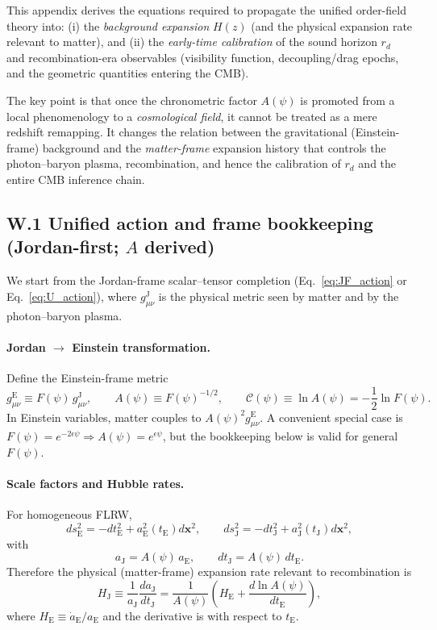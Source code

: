 \documentclass[10pt]{article}
\newcommand{\gJ}{g^{\mathrm{J}}}        %
\newcommand{\gE}{g^{\mathrm{E}}}        %
\newcommand{\aJ}{a_{\mathrm{J}}}
\newcommand{\aE}{a_{\mathrm{E}}}
\newcommand{\HJ}{H_{\mathrm{J}}}
\newcommand{\HE}{H_{\mathrm{E}}}
\newcommand{\tJ}{t_{\mathrm{J}}}
\newcommand{\tE}{t_{\mathrm{E}}}
\newcommand{\Fpsi}{F(\psi)}
\newcommand{\Apsi}{A(\psi)}
\newcommand{\Cpsi}{\mathcal{C}(\psi)} %
\begin{document}
This appendix derives the equations required to propagate the unified order-field theory into:
(i) the \emph{background expansion} $H(z)$ (and the physical expansion rate relevant to matter),
and (ii) the \emph{early-time calibration} of the sound horizon $r_d$ and recombination-era
observables (visibility function, decoupling/drag epochs, and the geometric quantities entering the CMB).

The key point is that once the chronometric factor $A(\psi)$ is promoted from a local phenomenology
to a \emph{cosmological field}, it cannot be treated as a mere redshift remapping. It changes the
relation between the gravitational (Einstein-frame) background and the \emph{matter-frame} expansion
history that controls the photon--baryon plasma, recombination, and hence the calibration of $r_d$
and the entire CMB inference chain.

\subsection{W.1 Unified action and frame bookkeeping (Jordan-first; \(A\) derived)}
\label{app:early_universe:frames}

We start from the Jordan-frame scalar--tensor completion
(Eq.~\eqref{eq:JF_action} or Eq.~\eqref{eq:U_action}), where \(\gJ_{\mu\nu}\) is the physical metric
seen by matter and by the photon--baryon plasma.

\paragraph{Jordan \(\rightarrow\) Einstein transformation.}
Define the Einstein-frame metric
\begin{equation}
\gE_{\mu\nu}\equiv \Fpsi\,\gJ_{\mu\nu},
\qquad
\Apsi \equiv \Fpsi^{-1/2},
\qquad
\Cpsi \equiv \ln\Apsi=-\frac12\ln\Fpsi.
\label{eq:W_conformal}
\end{equation}
In Einstein variables, matter couples to \(\Apsi^2\gE_{\mu\nu}\). A convenient special case is
\(F(\psi)=e^{-2\epsilon\psi}\Rightarrow \Apsi=e^{\epsilon\psi}\), but the bookkeeping below is valid
for general \(F(\psi)\).

\paragraph{Scale factors and Hubble rates.}
For homogeneous FLRW,
\begin{equation}
ds_{\mathrm{E}}^2=-d\tE^2+\aE^2(\tE)d\bm{x}^2,
\qquad
ds_{\mathrm{J}}^2=-d\tJ^2+\aJ^2(\tJ)d\bm{x}^2,
\end{equation}
with
\begin{equation}
\aJ = \Apsi\,\aE,
\qquad
d\tJ = \Apsi\,d\tE.
\end{equation}
Therefore the physical (matter-frame) expansion rate relevant to recombination is
\begin{equation}
\HJ \equiv \frac{1}{\aJ}\frac{d\aJ}{d\tJ}
=
\frac{1}{\Apsi}\left(\HE + \frac{d\ln\Apsi}{d\tE}\right),
\label{eq:W_HJ_HE}
\end{equation}
where \(\HE\equiv \dot\aE/\aE\) and the derivative is with respect to \(\tE\).
\end{document}
